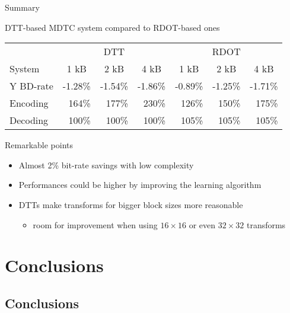 \documentclass[10pt]{beamer} %
\begin{document}
\begin{frame}{Summary}
	\begin{block}{DTT-based MDTC system compared to RDOT-based ones}
		\vspace{1em}
		\begin{tabular}{l|r|r|r||r|r|r}
			& \multicolumn{3}{c||}{DTT} & \multicolumn{3}{c}{RDOT}\\
			System
			& \multicolumn{1}{c|}{1 kB}
			& \multicolumn{1}{c|}{2 kB}
			& \multicolumn{1}{c||}{4 kB}
			& \multicolumn{1}{c|}{1 kB}
			& \multicolumn{1}{c|}{2 kB}
			& \multicolumn{1}{c}{4 kB} \\
			\hline\hline
			Y BD-rate & -1.28\% & -1.54\% & -1.86\% & -0.89\% & -1.25\% & -1.71\% \\
			Encoding  &   164\% &   177\% &   230\% &   126\% &   150\% &   175\% \\
			Decoding  &   100\% &   100\% &   100\% &   105\% &   105\% &   105\% \\
		\end{tabular}
	\end{block}
	\begin{block}{Remarkable points}
		\begin{itemize}
			\item Almost 2\% bit-rate savings with low complexity
			\item Performances could be higher by improving the learning
				algorithm
			\item DTTs make transforms for bigger block sizes more reasonable
				\begin{itemize}
					\item room for improvement when using $16\times16$ or even
						$32\times32$ transforms
				\end{itemize}
		\end{itemize}
	\end{block}
\end{frame}

\section{Conclusions}

\subsection*{Conclusions}
\end{document}
